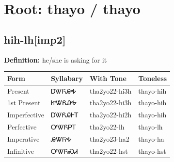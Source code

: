 \documentclass{article}%
\begin{document}
%
\normalsize%
\section*{Root: thayo / thayo}%
\subsection*{hih-lh[imp2]}%
\textbf{Definition: }%
he/she is asking for it%
\\[0.5em]%
\begin{tabular}{|l|l|l|l|}%
\hline%
\textbf{Form}&\textbf{Syllabary}&\textbf{With Tone}&\textbf{Toneless}\\%
\hline%
Present&ᎠᏔᏲᎯᎭ&tha2yo22{-}hi3h&thayo{-}hih\\%
1st Present&ᏥᏔᏲᎯᎭ&tha2yo22{-}hi3h&thayo{-}hih\\%
Imperfective&ᎠᏔᏲᎯᎰᎢ&tha2yo22{-}hi2h&thayo{-}hih\\%
Perfective&ᎤᏔᏲᏢᎢ&tha2yo22{-}lh&thayo{-}lh\\%
Imperative&ᎯᏔᏲᎭ&tha2yo23{-}ha2&thayo{-}ha\\%
Infinitive&ᎤᏔᏲᏍᏗ&tha2yo22{-}hst&thayo{-}hst\\%
\hline%
\end{tabular}%
\\[1em]%
\end{document}
